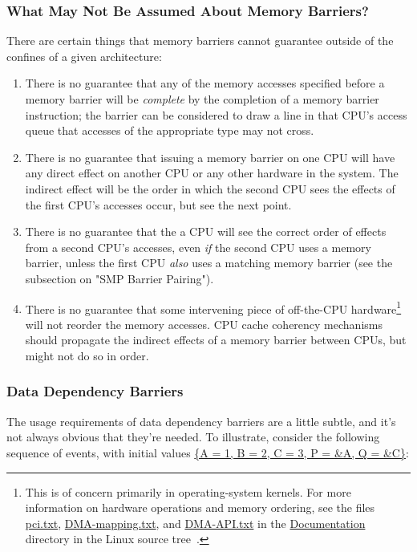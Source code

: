 \subsubsection{What May Not Be Assumed About Memory Barriers?}
\label{sec:advsync:What May Not Be Assumed About Memory Barriers?}

There are certain things that memory barriers cannot guarantee outside
of the confines of a given architecture:

\begin{enumerate}
\item	There is no guarantee that any of the memory accesses specified
	before a memory barrier will be \emph{complete} by the completion
	of a memory barrier instruction; the barrier can be considered
	to draw a line in that CPU's access queue that accesses of the
	appropriate type may not cross.
\item	There is no guarantee that issuing a memory barrier on one CPU
	will have any direct effect on another CPU or any other hardware
	in the system.	The indirect effect will be the order in which
	the second CPU sees the effects of the first CPU's accesses occur,
	but see the next point.
\item	There is no guarantee that the a CPU will see the correct order
	of effects from a second CPU's accesses, even \emph{if} the second CPU
	uses a memory barrier, unless the first CPU \emph{also} uses a matching
	memory barrier (see the subsection on "SMP Barrier Pairing").
\item	There is no guarantee that some intervening piece of off-the-CPU
	hardware\footnote{
		This is of concern primarily in operating-system kernels.
		For more information on hardware operations and memory
		ordering, see the files \url{pci.txt}, \url{DMA-mapping.txt},
		and \url{DMA-API.txt} in the \url{Documentation} directory in
		the Linux source tree~\cite{Torvalds2.6kernel}.}
	will not reorder the memory accesses.  CPU cache
	coherency mechanisms should propagate the indirect effects of
	a memory barrier between CPUs, but might not do so in order.
\end{enumerate}

\subsubsection{Data Dependency Barriers}
\label{sec:advsync:Data Dependency Barriers}

The usage requirements of data dependency barriers are a little subtle, and
it's not always obvious that they're needed.  To illustrate, consider the
following sequence of events, with initial values
\url{{A = 1, B = 2, C = 3, P = &A, Q = &C}}:

